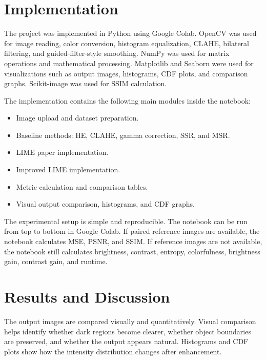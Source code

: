 \documentclass[11pt]{article}
\begin{document}
\begin{center}
\end{center}

\section{Implementation}
The project was implemented in Python using Google Colab. OpenCV was used for image reading, color conversion, histogram equalization, CLAHE, bilateral filtering, and guided-filter-style smoothing. NumPy was used for matrix operations and mathematical processing. Matplotlib and Seaborn were used for visualizations such as output images, histograms, CDF plots, and comparison graphs. Scikit-image was used for SSIM calculation.

The implementation contains the following main modules inside the notebook:

\begin{itemize}
    \item Image upload and dataset preparation.
    \item Baseline methods: HE, CLAHE, gamma correction, SSR, and MSR.
    \item LIME paper implementation.
    \item Improved LIME implementation.
    \item Metric calculation and comparison tables.
    \item Visual output comparison, histograms, and CDF graphs.
\end{itemize}

The experimental setup is simple and reproducible. The notebook can be run from top to bottom in Google Colab. If paired reference images are available, the notebook calculates MSE, PSNR, and SSIM. If reference images are not available, the notebook still calculates brightness, contrast, entropy, colorfulness, brightness gain, contrast gain, and runtime.

\section{Results and Discussion}
The output images are compared visually and quantitatively. Visual comparison helps identify whether dark regions become clearer, whether object boundaries are preserved, and whether the output appears natural. Histograms and CDF plots show how the intensity distribution changes after enhancement.
\end{document}
